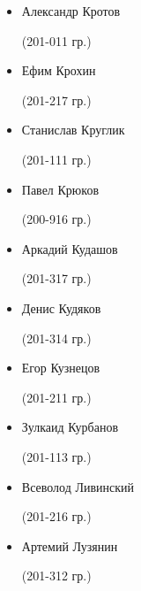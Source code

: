 \begin{multicols}{2}
\begin{small}
\begin{itemize}[leftmargin=0.5em]
	\item[] Александр Кротов\begin{tiny} (201-011 гр.)\end{tiny}
	\item[] Ефим Крохин\begin{tiny} (201-217 гр.)\end{tiny} %
	\item[] Станислав Круглик\begin{tiny} (201-111 гр.)\end{tiny}
	\item[] Павел Крюков\begin{tiny} (200-916 гр.)\end{tiny} %
	\item[] Аркадий Кудашов\begin{tiny} (201-317 гр.)\end{tiny} %
	\item[] Денис Кудяков\begin{tiny} (201-314 гр.)\end{tiny} %
	\item[] Егор Кузнецов\begin{tiny} (201-211 гр.)\end{tiny}
	\item[] Зулкаид Курбанов\begin{tiny} (201-113 гр.)\end{tiny}

	\item[] Всеволод Ливинский\begin{tiny} (201-216 гр.)\end{tiny} %
	\item[] Артемий Лузянин\begin{tiny} (201-312 гр.)\end{tiny} %


\end{itemize}
\end{small}
\end{multicols}
